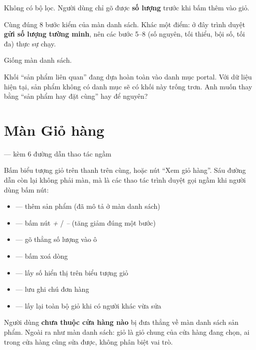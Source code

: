 \mloc

Không có bộ lọc. Người dùng chỉ gõ được \textbf{số lượng} trước khi bấm thêm vào giỏ.


Cùng đúng 8 bước kiểm của màn danh sách. Khác một điểm: ở đây trình duyệt \textbf{gửi số lượng
tường minh}, nên các bước 5--8 (số nguyên, tối thiểu, bội số, tối đa) thực sự chạy.

\mghi

Giống màn danh sách.

\mhoi

\begin{ask}
Khối ``sản phẩm liên quan'' đang dựa hoàn toàn vào danh mục portal. Với dữ liệu hiện tại, sản
phẩm không có danh mục sẽ có khối này trống trơn. Anh muốn thay bằng ``sản phẩm hay đặt cùng''
hay để nguyên?
\end{ask}

\section{Màn Giỏ hàng}
 --- kèm 6 đường dẫn thao tác ngầm
\medskip

\mvao

Bấm biểu tượng giỏ trên thanh trên cùng, hoặc nút ``Xem giỏ hàng''. Sáu đường dẫn còn lại không
phải màn, mà là các thao tác trình duyệt gọi ngầm khi người dùng bấm nút:

\begin{itemize}[leftmargin=*,itemsep=1pt]
  \item {} --- thêm sản phẩm (đã mô tả ở màn danh sách)
  \item {} --- bấm nút \emph{+} / \emph{--} (tăng giảm đúng một bước)
  \item {} --- gõ thẳng số lượng vào ô
  \item {} --- bấm xoá dòng
  \item {} --- lấy số hiển thị trên biểu tượng giỏ
  \item {} --- lưu ghi chú đơn hàng
  \item {} --- lấy lại toàn bộ giỏ khi có người khác vừa sửa
\end{itemize}

\mai

Người dùng \textbf{chưa thuộc cửa hàng nào} bị đưa thẳng về màn danh sách sản phẩm. Ngoài ra như
màn danh sách: giỏ là giỏ chung của cửa hàng đang chọn, ai trong cửa hàng cũng sửa được, không
phân biệt vai trò.

